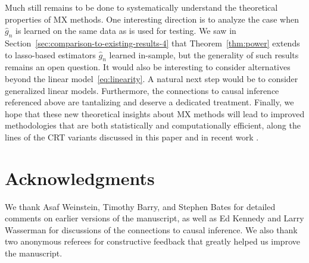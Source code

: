 \documentclass[12pt]{article}
\theoremstyle{definition}
\theoremstyle{remark}
\newcommand{\prx}{\bm X}
\newcommand{\prz}{\bm Z}
\begin{document}
%



Much still remains to be done to systematically understand the theoretical properties of MX methods. One interesting direction is to analyze the case when $\widehat g_n$ is learned on the same data as is used for testing. We saw in Section~\ref{sec:comparison-to-existing-results-4} that Theorem~\ref{thm:power} extends to lasso-based estimators $\widehat g_n$ learned in-sample, but the generality of such results remains an open question. It would also be interesting to consider alternatives beyond the linear model~\eqref{eq:linearity}. A natural next step would be to consider generalized linear models. Furthermore, the connections to causal inference referenced above are tantalizing and deserve a dedicated treatment. Finally, we hope that these new theoretical insights about MX methods will lead to improved methodologies that are both statistically and computationally efficient, along the lines of the CRT variants discussed in this paper and in recent work \cite{Liu2020}.


\section*{Acknowledgments}
We thank Asaf Weinstein, Timothy Barry, and Stephen Bates for detailed comments on earlier versions of the manuscript, as well as Ed Kennedy and Larry Wasserman for discussions of the connections to causal inference. We also thank two anonymous referees for constructive feedback that greatly helped us improve the manuscript.
\end{document}
